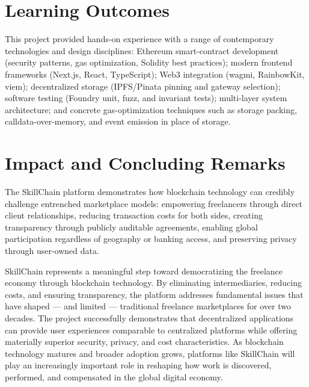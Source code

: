 \section{Learning Outcomes}

This project provided hands-on experience with a range of contemporary technologies and design disciplines: Ethereum smart-contract development (security patterns, gas optimization, Solidity best practices); modern frontend frameworks (Next.js, React, TypeScript); Web3 integration (wagmi, RainbowKit, viem); decentralized storage (IPFS/Pinata pinning and gateway selection); software testing (Foundry unit, fuzz, and invariant tests); multi-layer system architecture; and concrete gas-optimization techniques such as storage packing, calldata-over-memory, and event emission in place of storage.

\section{Impact and Concluding Remarks}

The SkillChain platform demonstrates how blockchain technology can credibly challenge entrenched marketplace models: empowering freelancers through direct client relationships, reducing transaction costs for both sides, creating transparency through publicly auditable agreements, enabling global participation regardless of geography or banking access, and preserving privacy through user-owned data.

SkillChain represents a meaningful step toward democratizing the freelance economy through blockchain technology. By eliminating intermediaries, reducing costs, and ensuring transparency, the platform addresses fundamental issues that have shaped --- and limited --- traditional freelance marketplaces for over two decades. The project successfully demonstrates that decentralized applications can provide user experiences comparable to centralized platforms while offering materially superior security, privacy, and cost characteristics. As blockchain technology matures and broader adoption grows, platforms like SkillChain will play an increasingly important role in reshaping how work is discovered, performed, and compensated in the global digital economy.

